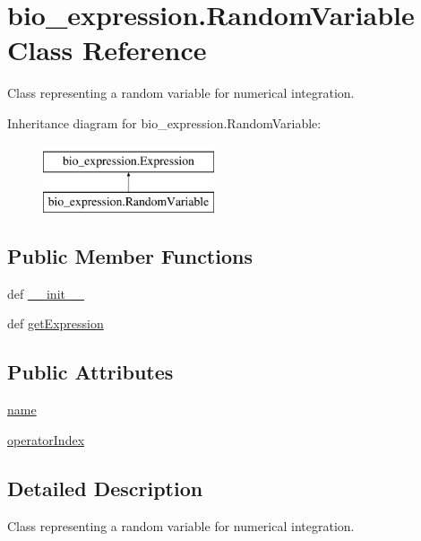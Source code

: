 \hypertarget{classbio__expression_1_1_random_variable}{\section{bio\+\_\+expression.\+Random\+Variable Class Reference}
\label{classbio__expression_1_1_random_variable}
}


Class representing a random variable for numerical integration.  


Inheritance diagram for bio\+\_\+expression.\+Random\+Variable\+:\begin{figure}[H]
\begin{center}
\leavevmode
\includegraphics[height=2.000000cm]{db/d24/classbio__expression_1_1_random_variable}
\end{center}
\end{figure}
\subsection*{Public Member Functions}
\begin{DoxyCompactItemize}
\item 
def \hyperlink{classbio__expression_1_1_random_variable_ac619638a2a053d96093c771cb736658b}{\+\_\+\+\_\+init\+\_\+\+\_\+}
\item 
def \hyperlink{classbio__expression_1_1_random_variable_a58bfdb0cf503addf6754bf9aec04b804}{get\+Expression}
\end{DoxyCompactItemize}
\subsection*{Public Attributes}
\begin{DoxyCompactItemize}
\item 
\hyperlink{classbio__expression_1_1_random_variable_adb0d67ebbf26c734c2675db7243b7e50}{name}
\item 
\hyperlink{classbio__expression_1_1_random_variable_aa36861c700b320e1c2557eea1e8011c3}{operator\+Index}
\end{DoxyCompactItemize}


\subsection{Detailed Description}
Class representing a random variable for numerical integration. 


